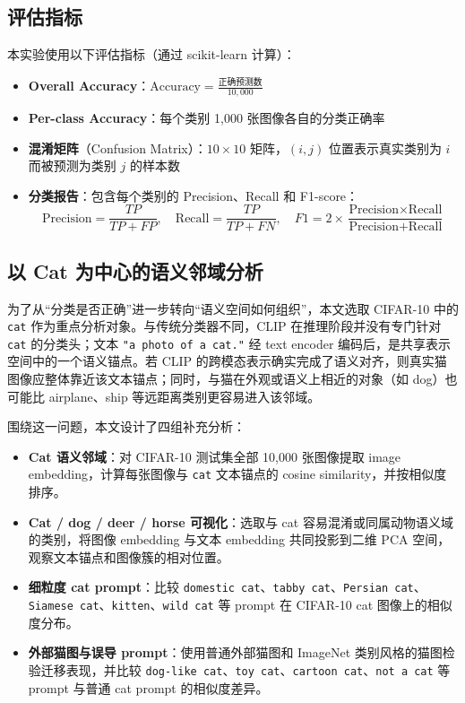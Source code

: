 \documentclass[12pt,a4paper]{ctexart}
\begin{document}
\subsection{评估指标}

本实验使用以下评估指标（通过 scikit-learn 计算）：

\begin{itemize}
    \item \textbf{Overall Accuracy}：$\text{Accuracy} = \frac{\text{正确预测数}}{10,000}$
    \item \textbf{Per-class Accuracy}：每个类别 1,000 张图像各自的分类正确率
    \item \textbf{混淆矩阵}（Confusion Matrix）：$10\times10$ 矩阵，$(i, j)$ 位置表示真实类别为 $i$ 而被预测为类别 $j$ 的样本数
    \item \textbf{分类报告}：包含每个类别的 Precision、Recall 和 F1-score：
    \begin{equation}
        \text{Precision} = \frac{TP}{TP + FP}, \quad
        \text{Recall} = \frac{TP}{TP + FN}, \quad
        F1 = 2 \times \frac{\text{Precision} \times \text{Recall}}{\text{Precision} + \text{Recall}}
    \end{equation}
\end{itemize}

\subsection{以 Cat 为中心的语义邻域分析}

为了从“分类是否正确”进一步转向“语义空间如何组织”，本文选取 CIFAR-10 中的 \texttt{cat} 作为重点分析对象。与传统分类器不同，CLIP 在推理阶段并没有专门针对 \texttt{cat} 的分类头；文本 \texttt{"a photo of a cat."} 经 text encoder 编码后，是共享表示空间中的一个语义锚点。若 CLIP 的跨模态表示确实完成了语义对齐，则真实猫图像应整体靠近该文本锚点；同时，与猫在外观或语义上相近的对象（如 dog）也可能比 airplane、ship 等远距离类别更容易进入该邻域。

围绕这一问题，本文设计了四组补充分析：

\begin{itemize}
    \item \textbf{Cat 语义邻域}：对 CIFAR-10 测试集全部 10,000 张图像提取 image embedding，计算每张图像与 \texttt{cat} 文本锚点的 cosine similarity，并按相似度排序。
    \item \textbf{Cat / dog / deer / horse 可视化}：选取与 cat 容易混淆或同属动物语义域的类别，将图像 embedding 与文本 embedding 共同投影到二维 PCA 空间，观察文本锚点和图像簇的相对位置。
    \item \textbf{细粒度 cat prompt}：比较 \texttt{domestic cat}、\texttt{tabby cat}、\texttt{Persian cat}、\texttt{Siamese cat}、\texttt{kitten}、\texttt{wild cat} 等 prompt 在 CIFAR-10 cat 图像上的相似度分布。
    \item \textbf{外部猫图与误导 prompt}：使用普通外部猫图和 ImageNet 类别风格的猫图检验迁移表现，并比较 \texttt{dog-like cat}、\texttt{toy cat}、\texttt{cartoon cat}、\texttt{not a cat} 等 prompt 与普通 cat prompt 的相似度差异。
\end{itemize}
\end{document}
